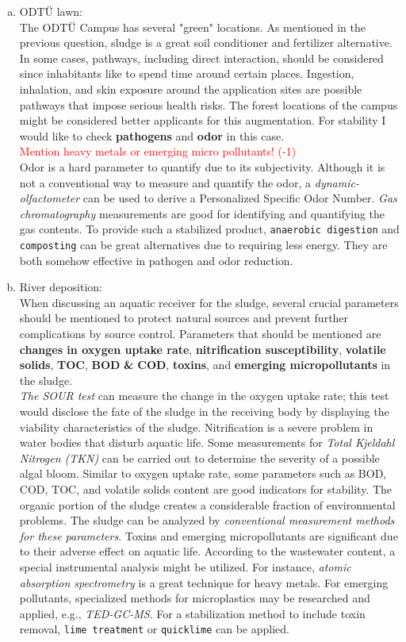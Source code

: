 \documentclass[a4paper]{article}
\begin{document}
\begin{enumerate}[a)]
    \item ODTÜ lawn:\\
    The ODTÜ Campus has several "green" locations. As mentioned in the previous question, sludge is a great soil conditioner and fertilizer alternative. In some cases, pathways, including direct interaction, should be considered since inhabitants like to spend time around certain places. Ingestion, inhalation, and skin exposure around the application sites are possible pathways that impose serious health risks. The forest locations of the campus might be considered better applicants for this augmentation. For stability I would like to check \textbf{pathogens} and \textbf{odor} in this case.\\
    \textcolor{red}{Mention heavy metals or emerging micro pollutants! (-1)}\\
    Odor is a hard parameter to quantify due to its subjectivity. Although it is not a conventional way to measure and quantify the odor, a \textit{dynamic-olfactometer} can be used to derive a Personalized Specific Odor Number\autocite{vesilind1988}. \textit{Gas chromatography} measurements are good for identifying and quantifying the gas contents\autocite{sanin2011}. To provide such a stabilized product, \texttt{anaerobic digestion} and \texttt{composting} can be great alternatives due to requiring less energy. They are both somehow effective in pathogen and odor reduction.
    \item River deposition:\\
    When discussing an aquatic receiver for the sludge, several crucial parameters should be mentioned to protect natural sources and prevent further complications by source control. Parameters that should be mentioned are \textbf{changes in oxygen uptake rate}, \textbf{nitrification susceptibility}, \textbf{volatile solids}, \textbf{TOC}, \textbf{BOD} \textbf{\&} \textbf{COD}, \textbf{toxins}, and \textbf{emerging micropollutants} in the sludge.\\
    \textit{The SOUR test} can measure the change in the oxygen uptake rate; this test would disclose the fate of the sludge in the receiving body by displaying the viability characteristics of the sludge. Nitrification is a severe problem in water bodies that disturb aquatic life. Some measurements for \textit{Total Kjeldahl Nitrogen (TKN)} can be carried out to determine the severity of a possible algal bloom. Similar to oxygen uptake rate, some parameters such as BOD, COD, TOC, and volatile solids content are good indicators for stability. The organic portion of the sludge creates a considerable fraction of environmental problems. The sludge can be analyzed by \textit{conventional measurement methods for these parameters}. Toxins and emerging micropollutants are significant due to their adverse effect on aquatic life. According to the wastewater content, a special instrumental analysis might be utilized. For instance, \textit{atomic absorption spectrometry} is a great technique for heavy metals. For emerging pollutants, specialized methods for microplastics may be researched and applied, e.g., \textit{TED-GC-MS}. For a stabilization method to include toxin removal, \texttt{lime treatment} or \texttt{quicklime} can be applied\autocite{sanin2011}.

\end{enumerate}
\end{document}
